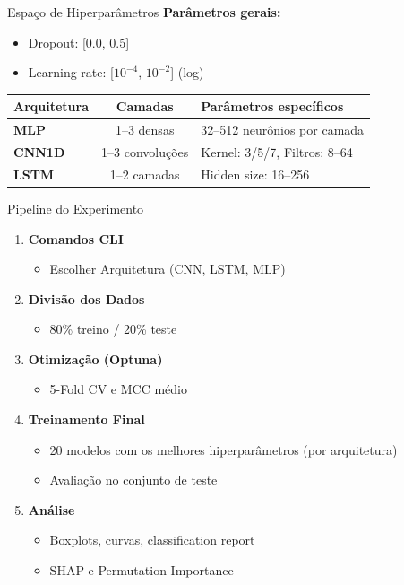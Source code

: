 \documentclass[10pt]{beamer}
\begin{document}
\begin{frame}{Espaço de Hiperparâmetros}
\textbf{Parâmetros gerais:}
  \begin{itemize}
    \item Dropout: [0.0, 0.5]
    \item Learning rate: [$10^{-4}$, $10^{-2}$] (log)
  \end{itemize}

\vspace{0.8em}
\begin{tabular}{|l|c|l|}
\hline
\textbf{Arquitetura} & \textbf{Camadas} & \textbf{Parâmetros específicos} \\
\hline
\textbf{MLP} & 1–3 densas & 32–512 neurônios por camada \\
\hline
\textbf{CNN1D} & 1–3 convoluções & Kernel: 3/5/7, Filtros: 8–64 \\
\hline
\textbf{LSTM} & 1–2 camadas & Hidden size: 16–256 \\
\hline
\end{tabular}
\end{frame}


\begin{frame}{Pipeline do Experimento}
\begin{enumerate}

\item \textbf{Comandos CLI}
  \begin{itemize}
    \item Escolher Arquitetura (CNN, LSTM, MLP)
  \end{itemize}

  \item \textbf{Divisão dos Dados}
  \begin{itemize}
    \item 80\% treino / 20\% teste
  \end{itemize}

  \item \textbf{Otimização (Optuna)}
  \begin{itemize}
    \item 5-Fold CV e MCC médio
  \end{itemize}

  \item \textbf{Treinamento Final}
  \begin{itemize}
    \item 20 modelos com os melhores hiperparâmetros (por arquitetura)
    \item Avaliação no conjunto de teste
  \end{itemize}

  \item \textbf{Análise}
  \begin{itemize}
    \item Boxplots, curvas, classification report
    \item SHAP e Permutation Importance
  \end{itemize}
\end{enumerate}
\end{frame}
\end{document}

